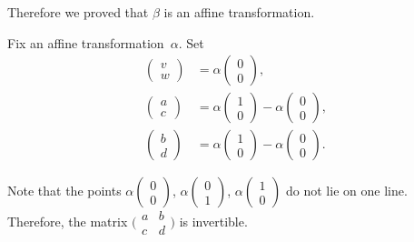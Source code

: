 Therefore we proved that $\beta$ is an affine transformation.

Fix an affine transformation~$\alpha$.
Set 
\begin{align*}
\left(\begin{smallmatrix}
v\\ w
\end{smallmatrix} \right)
&= 
\alpha\left(\begin{smallmatrix}
0\\ 0
\end{smallmatrix} \right),
\\
\left(\begin{smallmatrix}
a\\ c
\end{smallmatrix} \right)
&=
\alpha\left(\begin{smallmatrix}
1\\ 0
\end{smallmatrix} \right)
-
\alpha\left(\begin{smallmatrix}
0\\ 0
\end{smallmatrix} \right),
\\
\left(\begin{smallmatrix}
b\\ d
\end{smallmatrix} \right)
&=
\alpha\left(\begin{smallmatrix}
1\\ 0
\end{smallmatrix} \right)
-
\alpha\left(\begin{smallmatrix}
0\\ 0
\end{smallmatrix} \right).
\end{align*}


Note that the points 
$\alpha\left(\begin{smallmatrix}
0\\ 0
\end{smallmatrix} \right)$, 
$\alpha\left(\begin{smallmatrix}
0\\ 1
\end{smallmatrix} \right)$, 
$\alpha\left(\begin{smallmatrix}
1\\ 0
\end{smallmatrix} \right)$ do not lie on one line. 
Therefore, the matrix $\bigl(\begin{smallmatrix}
a&b\\ c&d
\end{smallmatrix} \bigr)$
is invertible.

